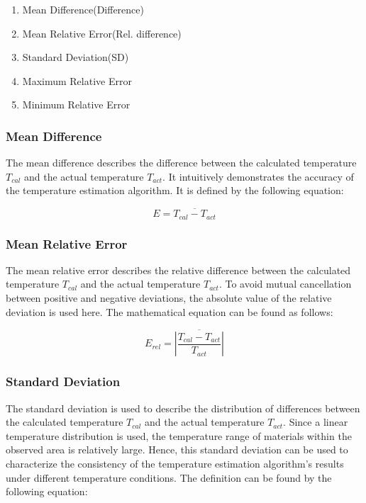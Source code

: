 \begin{enumerate}
    \item Mean Difference(Difference)
    \item Mean Relative Error(Rel. difference)
    \item Standard Deviation(SD)
    \item Maximum Relative Error
    \item Minimum Relative Error
\end{enumerate}

\subsubsection{Mean Difference}
The mean difference describes the difference between the calculated 
temperature $T_{cal}$ and the actual temperature $T_{act}$. It intuitively 
demonstrates the accuracy of the temperature estimation algorithm. It is 
defined by the following equation:

\begin{equation}
    {E} = \overline{T_{cal} - T_{act}} 
\end{equation}

\subsubsection{Mean Relative Error}
The mean relative error describes the relative difference between the calculated 
temperature $T_{cal}$ and the actual temperature $T_{act}$. To avoid mutual 
cancellation between positive and negative deviations, the absolute value of 
the relative deviation is used here. The mathematical equation can be found as follows:

\begin{equation}
    {E}_{rel} = \overline{\left\lvert \frac{T_{cal} - T_{act}}{T_{act}}\right\rvert }
\end{equation}

\subsubsection{Standard Deviation}
The standard deviation is used to describe the distribution of differences 
between the calculated temperature $T_{cal}$ and the actual 
temperature $T_{act}$. Since a linear temperature distribution is used, the 
temperature range of materials within the observed area is relatively large. 
Hence, this standard deviation can be used to characterize the consistency of the 
temperature estimation algorithm's results under different temperature conditions.
The definition can be found by the following equation:

